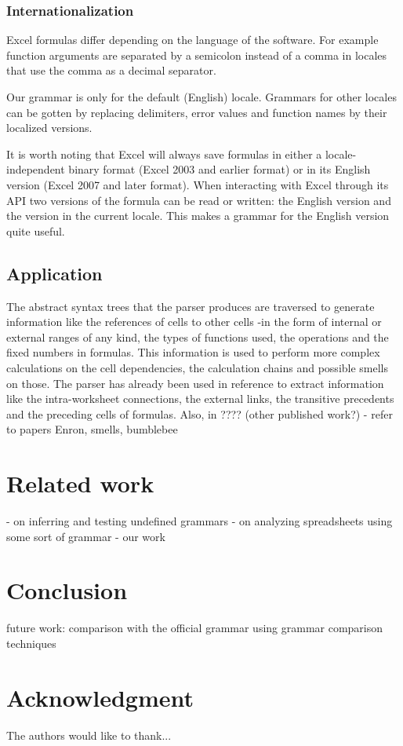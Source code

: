 \documentclass[conference]{IEEEtran}
\begin{document}
\subsubsection{Internationalization}

Excel formulas differ depending on the language of the software. For example function arguments are separated by a semicolon instead of a comma in locales that use the comma as a decimal separator.

Our grammar is only for the default (English) locale. Grammars for other locales can be gotten by replacing delimiters, error values and function names by their localized versions.

It is worth noting that Excel will always save formulas in either a locale-independent binary format (Excel 2003 and earlier format) or in its English version (Excel 2007 and later format). When interacting with Excel through its API two versions of the formula can be read or written: the English version and the version in the current locale.
This makes a grammar for the English version quite useful.

\subsection{Application}
The abstract syntax trees that the parser produces are traversed to generate information like the references of cells to other cells -in the form of internal or external ranges of any kind, the types of functions used, the operations and the fixed numbers in formulas. This information is used to perform more complex calculations on the cell dependencies, the calculation chains and possible smells on those. The parser has already been used in reference \cite{EnronVSEuses} to extract information like the intra-worksheet connections, the external links, the transitive precedents and the preceding cells of formulas. Also, in ???? (other published work?) - refer to papers Enron, smells, bumblebee

\section{Related work}
- on inferring and testing undefined grammars
- on analyzing spreadsheets using some sort of grammar
- our work

\section{Conclusion}
future work:
comparison with the official grammar using grammar comparison techniques


\section*{Acknowledgment}
The authors would like to thank...




\end{document}
